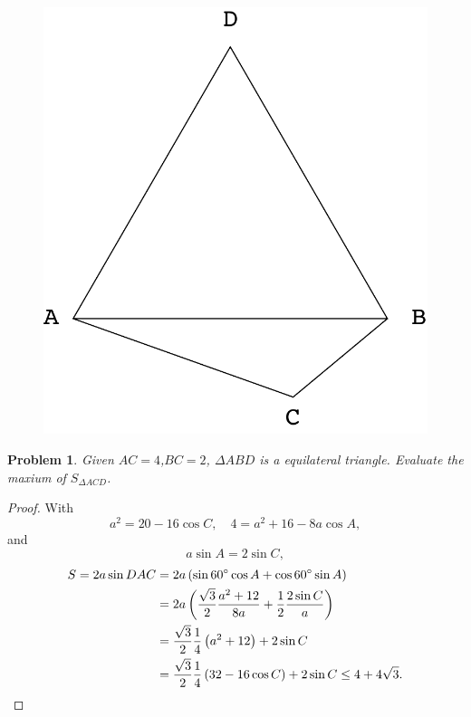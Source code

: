 \documentclass{ctexart}
\newtheorem{prob}{Problem}
\newcommand{\sint}{\frac{\sqrt{3}}{2}}
\newcommand{\half}{\frac{1}{2}}
\newcommand{\qurad}{\frac{1}{4}}
\newcommand{\pare}[1]{\left(#1\right)}
\newcommand{\degr}{^\circ}
\begin{document}
\begin{figure}[!h]
\centering
\includegraphics[page=1,width=.5\linewidth]{Triangle1.pdf}
\caption{}
\end{figure}

\begin{prob}
Given $AC=4$,$BC=2$, $\Delta ABD$ is a equilateral triangle. Evaluate the maxium of $S_{\Delta ACD}$.
\end{prob}
\begin{proof}
With \[ a^2 = 20 - 16 \cos C,\quad 4 = a^2 + 16 - 8a\cos A, \]
and \[ a \sin A = 2 \sin C, \]
\begingroup
\begin{align*}
S = 2a\sin DAC &= 2a \pare{ \sin 60\degr \cos A + \cos 60 \degr \sin A } \\
&= 2a \pare{\sint \frac{a^2 + 12}{8a} + \half \frac{2\sin C}{a}} \\
&= \sint\qurad\pare{a^2+12} + 2\sin C \\
&= \sint\qurad\pare{32 - 16 \cos C} + 2\sin C \le 4 + 4\sqrt{3}. \qedhere
\end{align*}
\end{proof}
\endgroup
\end{document}
